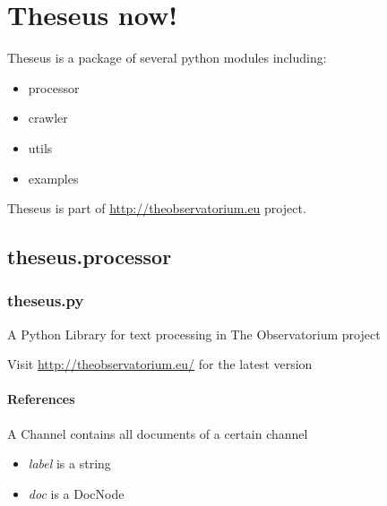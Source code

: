 \documentclass[letterpaper,10pt,english]{sphinxmanual}
\begin{document}
\section{Theseus now!}
\label{theseus:theseus-now}\label{theseus::doc}
Theseus is a package of several python modules including:
\begin{itemize}
\item {} 
processor

\item {} 
crawler

\item {} 
utils

\item {} 
examples

\end{itemize}

Theseus is part of \href{http://theobservatorium.eu}{http://theobservatorium.eu} project.


\subsection{theseus.processor}
\label{theseus:theseus-processor}\label{theseus:module-theseus.processor.theseus}

\subsubsection{theseus.py}
\label{theseus:theseus-py}
A Python Library for text processing in The Observatorium project

Visit \href{http://theobservatorium.eu/}{http://theobservatorium.eu/} for the latest version
\paragraph{References}

\begin{fulllineitems}
\label{theseus:theseus.processor.theseus.Channel}
A Channel contains all documents of a certain channel
\begin{itemize}
\item {} 
\emph{label} is a string

\item {} 
\emph{doc} is a DocNode

\end{itemize}

\end{fulllineitems}
\end{document}
